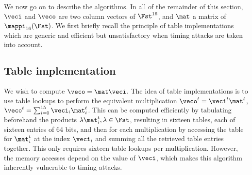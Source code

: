 \bigskip

We now go on to describe the algorithms.
In all of the remainder of this section, $\veci$ and $\veco$ are two column vectors of $\Fst^{16}$, and $\mat$ a matrix
of $\mappi_{16}(\Fst)$.
We first briefly recall the principle of table implementations which are generic and efficient but unsatisfactory when timing attacks are taken into account.

\subsection{Table implementation}



We wish to compute $\veco = \mat\veci$. The idea of table implementations is to use table lookups to perform the equivalent multiplication
$\veco^t = \veci^t\mat^t$, \ie $\veco^t = \sum_{i = 0}^{15} \veci_i\mat^t_i$.
This can be computed efficiently by tabulating beforehand the products $\lambda\mat^t_i, \lambda\in\Fst$, resulting in
sixteen tables, each of sixteen entries of 64 bits, and then for each
multiplication by accessing the table for $\mat^t_i$ at the index $\veci_i$ and summing all the retrieved table entries together.
This only requires sixteen table lookups per multiplication. However, the memory accesses depend on the value of $\veci$,
which makes this algorithm inherently vulnerable to timing attacks.

